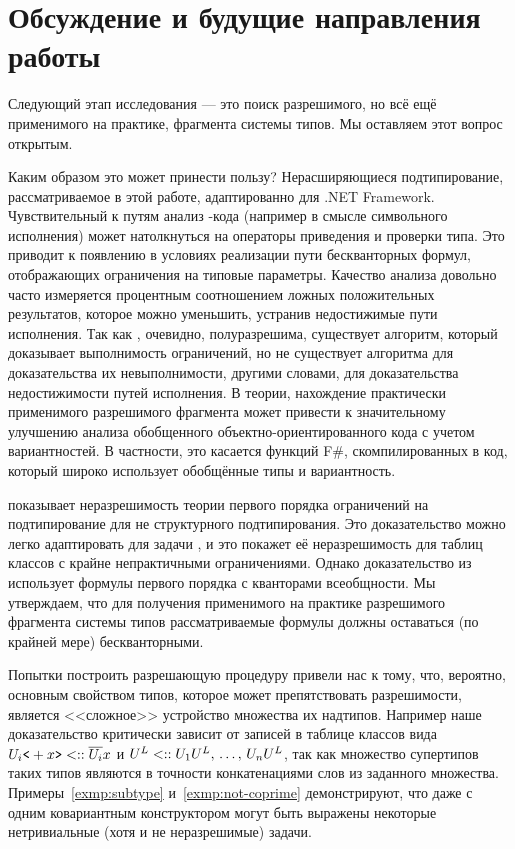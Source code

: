 \section{Обсуждение и будущие направления работы}

Следующий этап исследования --- это поиск разрешимого, но всё ещё применимого на практике, фрагмента системы типов. Мы оставляем этот вопрос открытым.

Каким образом это может принести пользу? Нерасширяющиеся подтипирование, рассматриваемое в этой работе, адаптированно для .NET Framework. Чувствительный к путям анализ \dotnet-кода (например в смысле символьного исполнения) может натолкнуться на операторы приведения и проверки типа. Это приводит к появлению в условиях реализации пути бескванторных формул, отображающих ограничения на типовые параметры. Качество анализа довольно часто измеряется процентным соотношением ложных положительных результатов, которое можно уменьшить, устранив недостижимые пути исполнения. Так как \subtypesat{}, очевидно, полуразрешима, существует алгоритм, который доказывает выполнимость ограничений, но не существует алгоритма для доказательства их невыполнимости, другими словами, для доказательства недостижимости путей исполнения. В теории, нахождение практически применимого разрешимого фрагмента может привести к значительному улучшению анализа обобщенного объектно-ориентированного кода с учетом вариантностей. В частности, это касается функций F\#, скомпилированных в код, который широко использует обобщённые типы и вариантность.

\cite{su2002first} показывает неразрешимость теории первого порядка ограничений на подтипирование для не структурного подтипирования. Это доказательство можно легко адаптировать для задачи \cite{su2002first}, и это покажет её неразрешимость для таблиц классов с крайне непрактичными ограничениями. Однако доказательство из~\cite{su2002first} использует формулы первого порядка с кванторами всеобщности. Мы утверждаем, что для получения применимого на практике разрешимого фрагмента системы типов рассматриваемые формулы должны оставаться (по крайней мере) бескванторными.

Попытки построить разрешающую процедуру привели нас к тому, что, вероятно, основным свойством типов, которое может препятствовать разрешимости, является <<сложное>> устройство множества их надтипов. Например наше доказательство критически зависит от записей в таблице классов вида ${U}_{i}\texttt{<}+x\texttt{>} <:: \overline{{U}_{i}}{x}$ и ${U}^{L} <:: {U}_{1}{U}^{L}, \, \ldots, \, {U}_{n}{U}^{L}$, так как множество супертипов таких типов являются в точности конкатенациями слов из заданного множества. Примеры~\ref{exmp:subtype} и~\ref{exmp:not-coprime} демонстрируют, что даже с одним ковариантным конструктором могут быть выражены некоторые нетривиальные (хотя и не неразрешимые) задачи.


